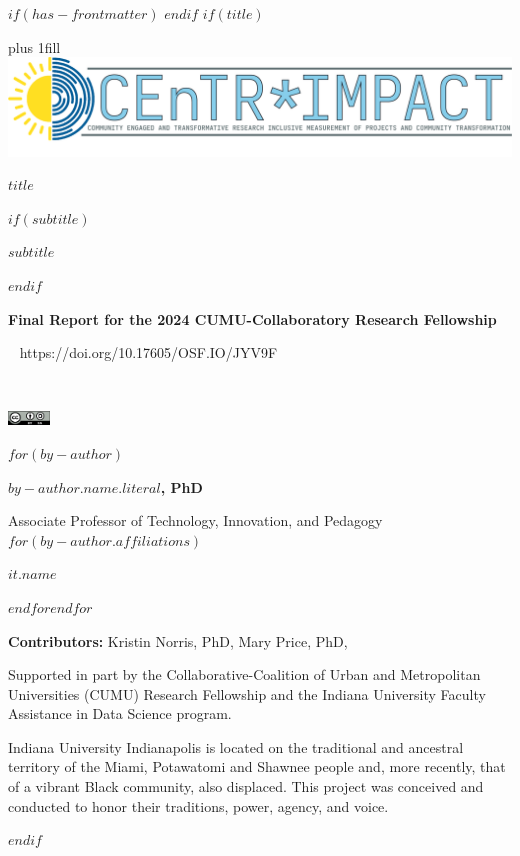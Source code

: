 $if(has-frontmatter)$
\frontmatter
$endif$
$if(title)$
\cleardoublepage
\thispagestyle{empty}
{\centering
\hbox{}\vskip 0cm plus 1fill
\includegraphics[width=6in]{../images/centr-impact-logo.png}
{\Huge\sffamily\bfseries $title$ \par}
$if(subtitle)$
\vspace{3ex}
{\Large\sffamily\bfseries $subtitle$ \par}
$endif$
\vspace{6ex}
{\bfseries\large Final Report for the 2024 CUMU-Collaboratory Research Fellowship \par}
\vspace{3ex}
{\textcolor{doicolor}{\aiDoi} ~ https://doi.org/10.17605/OSF.IO/JYV9F \par}
{\textcolor{iucolor}{\aiOpenData} ~ ~ \textcolor{orange}{\aiOpenAccess} ~ ~ \textcolor{osfcolor}{\aiOSF} ~ ~ {\includegraphics[height=11pt]{../images/By-SA} \par}
\vspace{12ex}
$for(by-author)$
{\Large\bfseries $by-author.name.literal$, PhD  \par}
{Associate Professor of Technology, Innovation, and Pedagogy \\}
$for(by-author.affiliations)$%
{$it.name$ \par}
$endfor$$endfor$
{\textbf{Contributors:} Kristin Norris, PhD, Mary Price, PhD, \par}
\vspace{6ex}
{\small Supported in part by the Collaborative-Coalition of Urban and Metropolitan Universities (CUMU) Research Fellowship and the Indiana University Faculty Assistance in Data Science program. \par}
\vspace{6ex}
{\small Indiana University Indianapolis is located on the traditional and ancestral territory of the Miami, Potawatomi and Shawnee people and, more recently, that of a vibrant Black community, also displaced. This project was conceived and conducted to honor their traditions, power, agency, and voice. \par}
}}
$endif$